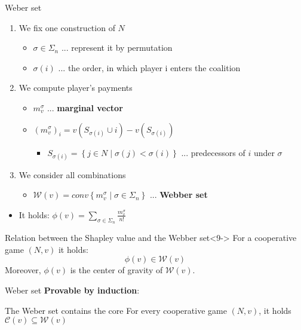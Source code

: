 \documentclass{beamer}
\begin{document}
\begin{frame}{Weber set}
    \begin{enumerate}
		\item<2-> We fix one construction of $N$
		\begin{itemize}
			\item<3-> $\sigma \in \Sigma_n$ ... represent it by permutation
			\item<3-> $\sigma(i)$ ... the order, in which player i enters the coalition
		\end{itemize}
		\item<4-> We compute player's payments
		\begin{itemize}
			\item<5-> $m^\sigma_v$ ... \textbf{marginal vector}
			\item<5-> $\left(m^\sigma_v\right)_i=v\left(S_{\sigma(i)}\cup i\right)-v\left(S_{\sigma(i)}\right)$
			\begin{itemize}
				\item<5-> $S_{\sigma(i)}= \left\{j \in N \mid \sigma(j) < \sigma(i)\right\}$ ... predecessors of $i$ under $\sigma$
			\end{itemize}
		\end{itemize}
		\item<6-> We consider all combinations
		\begin{itemize}
			\item<7-> $\mathcal{W}(v)=conv\left\{m^{\sigma}_{v}\mid \sigma \in \Sigma_n\right\}$ ... \textbf{Webber set}
		\end{itemize}
	\end{enumerate}
	\begin{itemize}
		\item<8-> It holds: $\phi(v)=\sum_{\sigma \in \Sigma_n} \frac{m^\sigma_v}{n!}$
	\end{itemize}
	\begin{block}{Relation between the Shapley value and the Webber set}<9->
		For a cooperative game $(N,v)$ it holds:
		\[\phi(v) \in \mathcal{W}(v)\]
		Moreover, $\phi(v)$ is the center of gravity of $\mathcal{W}(v)$.
	\end{block}
\end{frame}



\begin{frame}{Weber set}
    \textbf{Provable by induction}:
	\begin{block}{The Weber set contains the core}
		For every cooperative game $(N,v)$, it holds $\mathcal{C}(v) \subseteq \mathcal{W}(v)$
	\end{block}
\end{frame}
\end{document}
